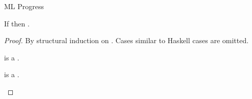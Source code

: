 \begin{theorem}{ML Progress}

\label{thmpsm}

If \judem{}{\first{\varexpm}}{\vartym} then \pshyp{\first{\varexpm}}{\second{\varexpm}}.

\begin{proof}

By structural induction on \first{\varexpm}.  Cases similar to Haskell cases are omitted.


\newcommand{\psconswm}{\expcons{\first{\varvalum}}{\second{\varvalum}}\xspace}

\begin{case}{\psconswm}

\psconswm is a \profv.

\end{case}


\newcommand{\psfappm}{\expfapp{\first{\varexpm}}{\second{\varexpm}}}
\renewcommand{\x}{\expfabss{\varvarm}{\first{\vartym}}{\third{\varexpm}}}

\begin{case}{\psfappm}

\pshypby
{\first{\varexpm}}
{\third{\varexpm}}
\psvalifeqm
{\first{\varexpm}}
{\tyfun{\first{\vartym}}{\second{\vartym}}}
{\x}
\pssub
{\first{\varexpm}}
{\third{\varexpm}}
{\psfappm}
{\expfapp{\third{\varexpm}}{\second{\varexpm}}}
\pserr
{\first{\varexpm}}
{\psfappm}
\pshypby
{\second{\varexpm}}
{\third{\varexpm}}
\pssuband
{\second{\varexpm}}
{\third{\varexpm}}
{\first{\varexpm}}
{\psfappm}
{\expfapp{\first{\varexpm}}{\third{\varexpm}}}
\pserrand
{\second{\varexpm}}
{\first{\varexpm}}
{\psfappm}
\psred
{\expfapp{(\x)}{\second{\varexpm}}}
{\expsubst{\third{\varexpm}}{\second{\varexpm}}{\varvarm}}

\end{case}


\newcommand{\psconsem}{\expcons{\first{\varexpm}}{\second{\varexpm}}\xspace}

\begin{case}{\psconsem}

\pshypby
{\first{\varexpm}}
{\third{\varexpm}}
\pssub
{\first{\varexpm}}
{\third{\varexpm}}
{\psconsem}
{\expcons{\third{\varexpm}}{\second{\varexpm}}}
\pserr
{\first{\varexpm}}
{\psconsem}
\pssuband
{\second{\varexpm}}
{\third{\varexpm}}
{\first{\varexpm}}
{\psconsem}
{\expcons{\third{\varexpm}}{\second{\varexpm}}}
\pserrand
{\second{\varexpm}}
{\first{\varexpm}}
{\psconsem}
\psvaliftwo
{\first{\varexpm}}
{\second{\varexpm}}
{\psconsem is a \profv.}

\end{case}

\end{proof}

\end{theorem}
